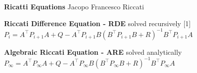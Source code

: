
\begin{sstTitleBox}[ForestGreen]{\center\textbf{\large
			Ricatti Equations
		}
		Jacopo Francesco Riccati
	}


	\begin{sstOnlyFrame}[ForestGreen]
		{\textbf{Riccati Difference Equation - RDE} solved recursively}
		\scalebox{0.97}[1]{$
				\scriptstyle
				P_i = A^\top P_{i+1} A
				+ Q - A^\top P_{i+1} B
				(B^\top P_{i+1} B + R)^{-1}
				B^\top P_{i+1} A$}
	\end{sstOnlyFrame}

	\begin{sstOnlyFrame}[ForestGreen]
		{\textbf{Algebraic Riccati Equation - ARE} solved analytically}
		{\center$\scriptstyle
				P_\infty = A^\top P_\infty A
				+ Q - A^\top P_\infty B
				(B^\top P_\infty B + R)^{-1}
				B^\top P_\infty A$}
	\end{sstOnlyFrame}

\end{sstTitleBox}
